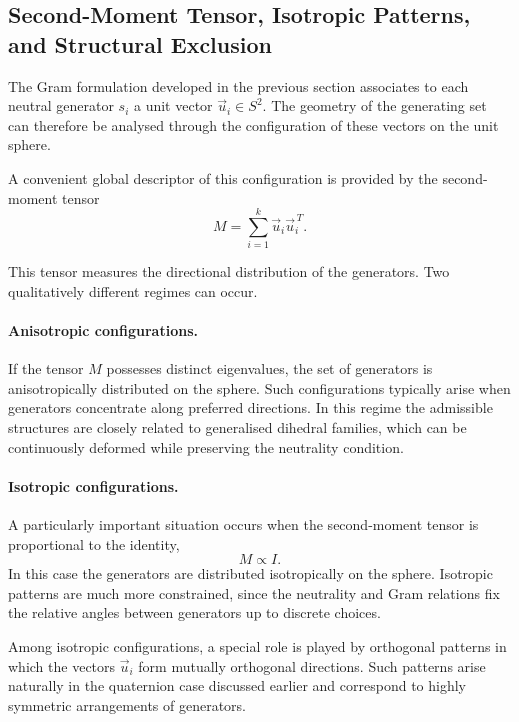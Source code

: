 \subsection{Second-Moment Tensor, Isotropic Patterns, and Structural Exclusion}
  \label{subsec:second-moment}

  The Gram formulation developed in the previous section associates to each
  neutral generator $s_i$ a unit vector $\vec{u}_i\in S^2$.
  The geometry of the generating set can therefore be analysed through the
  configuration of these vectors on the unit sphere.

  A convenient global descriptor of this configuration is provided by the
  second-moment tensor
  \begin{equation}
    M=\sum_{i=1}^{k} \vec{u}_i \vec{u}_i^{\,T}.
  \end{equation}

  This tensor measures the directional distribution of the generators.
  Two qualitatively different regimes can occur.

  \paragraph{Anisotropic configurations.}
    If the tensor $M$ possesses distinct eigenvalues, the set of generators is
    anisotropically distributed on the sphere.
    Such configurations typically arise when generators concentrate along
    preferred directions.
    In this regime the admissible structures are closely related to
    generalised dihedral families, which can be continuously deformed while
    preserving the neutrality condition.

  \paragraph{Isotropic configurations.}
    A particularly important situation occurs when the second-moment tensor
    is proportional to the identity,
    \begin{equation}
      M \propto I .
    \end{equation}
    In this case the generators are distributed isotropically on the sphere.
    Isotropic patterns are much more constrained, since the neutrality and
    Gram relations fix the relative angles between generators up to discrete
    choices.

    Among isotropic configurations, a special role is played by orthogonal
    patterns in which the vectors $\vec{u}_i$ form mutually orthogonal
    directions.
    Such patterns arise naturally in the quaternion case discussed earlier
    and correspond to highly symmetric arrangements of generators.

